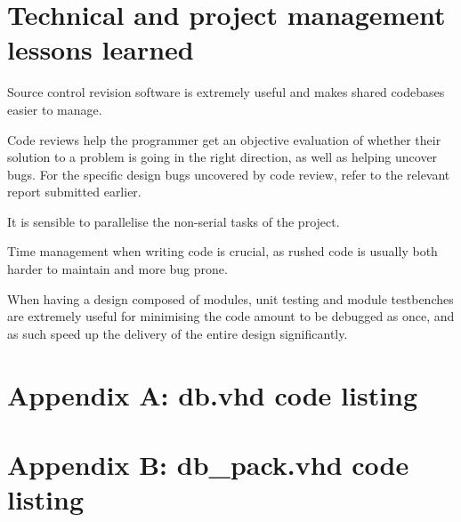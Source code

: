 \documentclass[]{article}
\begin{document}
\section{Technical and project management lessons learned} %
\label{sec:technical_and_project_management_lessons_learned}


Source control revision software is extremely useful and makes shared codebases easier to manage.

Code reviews help the programmer get an objective evaluation of whether their solution to a problem is going in the right direction, as well as helping uncover bugs. For the specific design bugs uncovered by code review, refer to the relevant report submitted earlier.

It is sensible to parallelise the non-serial tasks of the project.

Time management when writing code is crucial, as rushed code is usually both harder to maintain and more bug prone.

When having a design composed of modules, unit testing and module testbenches are extremely useful for minimising the code amount to be debugged as once, and as such speed up the delivery of the entire design significantly.


\clearpage

\section{Appendix A: db.vhd code listing} %
\label{sec:appendix_a_db_vhd_code_listing}




\clearpage

\section{Appendix B: db\_pack.vhd code listing} %
\label{sec:appendix_b_db_pack_vhd_code_listing}


\end{document}

